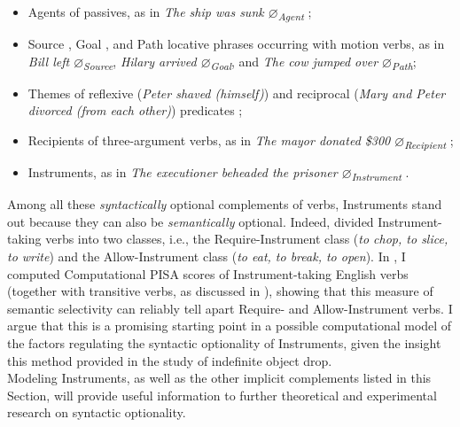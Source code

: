\begin{itemize}
    \item Agents of passives, as in \textit{The ship was sunk $\varnothing$\textsubscript{Agent}} \parencite{BhattPancheva2017implicit, Lasersohn1993, RuppenhoferMichaelis2014};
    \item Source \parencite{Gillon2006english}, Goal \parencite{Lasersohn1993, RuppenhoferMichaelis2014}, and Path \parencite{recanati2002unarticulated} locative phrases occurring with motion verbs, as in \textit{Bill left $\varnothing$\textsubscript{Source}}, \textit{Hilary arrived $\varnothing$\textsubscript{Goal}}, and  \textit{The cow jumped over $\varnothing$\textsubscript{Path}};
    \item Themes of reflexive (\textit{Peter shaved (himself)}) and reciprocal (\textit{Mary and Peter divorced (from each other)}) predicates \parencite{NemethEniko2014};
    \item Recipients of three-argument verbs, as in \textit{The mayor donated \$300 $\varnothing$\textsubscript{Recipient}} \parencite{ruppenhofer2005regularities};
    \item Instruments, as in \textit{The executioner beheaded the prisoner $\varnothing$\textsubscript{Instrument}} \parencite{KoenigEtAl2002, KoenigEtAl2003, KoenigEtAl2007, RissmanEtAl2015, RissmanRawlins2017, Rissman2010}.
\end{itemize}

Among all these \textit{syntactically} optional complements of verbs, Instruments stand out because they can also be \textit{semantically} optional. Indeed, \textcite{KoenigEtAl2002, KoenigEtAl2003, KoenigEtAl2007} divided Instrument-taking verbs into two classes, i.e., the Require-Instrument class (\textit{to chop, to slice, to write}) and the Allow-Instrument class (\textit{to eat, to break, to open}). In \textcite{CappelliLenciPISA}, I computed Computational PISA scores of Instrument-taking English verbs (together with transitive verbs, as discussed in ), showing that this measure of semantic selectivity can reliably tell apart Require- and Allow-Instrument verbs. I argue that this is a promising starting point in a possible computational model of the factors regulating the syntactic optionality of Instruments, given the insight this method provided in the study of indefinite object drop.\\
Modeling Instruments, as well as the other implicit complements listed in this Section, will provide useful information to further theoretical and experimental research on syntactic optionality.

